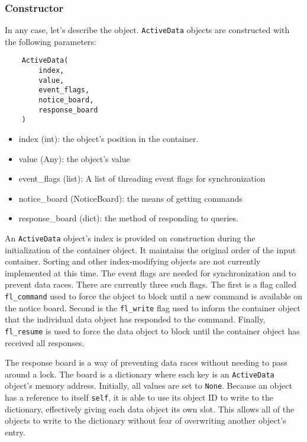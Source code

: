 \documentclass[10pt]{article}
\begin{document}
	\subsubsection{Constructor}
	In any case, let's describe the object. \lstinline|ActiveData| objects are constructed with the following parameters:
	
	\begin{lstlisting}
	ActiveData(
		index,
		value,
		event_flags,
		notice_board,
		response_board
	)
	\end{lstlisting}
	\begin{itemize}
		\item index (int): the object's position in the container.
		\item value (Any): the object's value
		\item event\_flags (list): A list of threading event flags for synchronization
		\item notice\_board (NoticeBoard): the means of getting commands
		\item response\_board (dict): the method of responding to queries.
	\end{itemize}
	
	An \lstinline|ActiveData| object's index is provided on construction during the initialization of the container object. It maintains the original order of the input container. Sorting and other index-modifying objects are not currently implemented at this time.
	The event flags are needed for synchronization and to prevent data races. There are currently three such flags. The first is a flag called \lstinline|fl_command| used to force the object to block until a new command is available on the notice board. Second is the \lstinline|fl_write| flag used to inform the container object that the individual data object has responded to the command. Finally, \lstinline|fl_resume| is used to force the data object to block until the container object has received all responses.
	
	The response board is a way of preventing data races without needing to pass around a lock. The board is a dictionary where each key is an \lstinline|ActiveData| object's memory address. Initially, all values are set to \lstinline|None|. Because an object has a reference to itself \lstinline|self|, it is able to use its object ID to write to the dictionary, effectively giving each data object its own slot. This allows all of the objects to write to the dictionary without fear of overwriting another object's entry.
	
\end{document}
